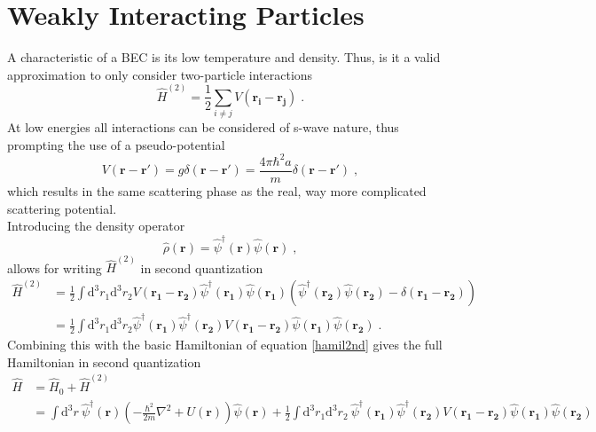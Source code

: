 \section{Weakly Interacting Particles}
A characteristic of a BEC is its low temperature and density. Thus, is it a valid approximation to only consider two-particle interactions
\begin{equation}
	\hat{H}^{(2)} = \frac{1}{2} \sum_{i \neq j} V(\boldsymbol{r_i} - \boldsymbol{r_j}) \; .
\end{equation}
At low energies all interactions can be considered of s-wave nature, thus prompting the use of a pseudo-potential
\begin{equation}
	V(\boldsymbol{r} - \boldsymbol{r'}) = g \delta(\boldsymbol{r} - \boldsymbol{r'}) = \frac{4 \pi \hbar^2 a}{m} \delta(\boldsymbol{r} - \boldsymbol{r'}) \; ,
\end{equation}
which results in the same scattering phase as the real, way more complicated scattering potential.\\
Introducing the density operator
\begin{equation}
	\hat{\rho}(\boldsymbol{r}) = \hat{\psi}^{\dag}(\boldsymbol{r}) \hat{\psi}(\boldsymbol{r}) \; ,
\end{equation}
allows for writing $\hat{H}^{(2)}$ in second quantization
\begin{align}
	\hat{H}^{(2)} &= \frac{1}{2} \int \mathrm{d^3}r_1 \mathrm{d^3}r_2 V(\boldsymbol{r_1} - \boldsymbol{r_2}) \hat{\psi}^{\dag}(\boldsymbol{r_1}) \hat{\psi}(\boldsymbol{r_1}) \left( \hat{\psi}^{\dag}(\boldsymbol{r_2}) \hat{\psi}(\boldsymbol{r_2}) - \delta(\boldsymbol{r_1} - \boldsymbol{r_2}) \right) \\
	&= \frac{1}{2} \int \mathrm{d^3}r_1 \mathrm{d^3}r_2  \hat{\psi}^{\dag}(\boldsymbol{r_1}) \hat{\psi}^{\dag}(\boldsymbol{r_2}) V(\boldsymbol{r_1} - \boldsymbol{r_2}) \hat{\psi}(\boldsymbol{r_1}) \hat{\psi}(\boldsymbol{r_2}) \; .
\end{align}
Combining this with the basic Hamiltonian of equation \ref{hamil2nd} gives the full Hamiltonian in second quantization
\begin{align}
	\hat{H} &= \hat{H}_0 + \hat{H}^{(2)} \\
	& = \int \mathrm{d^3}r \ \hat{\psi}^{\dag}(\boldsymbol{r}) \left( - \frac{\hbar^2}{2 m} \nabla^2 + U(\boldsymbol{r})\right) \hat{\psi}(\boldsymbol{r}) + \frac{1}{2} \int \mathrm{d^3}r_1 \mathrm{d^3}r_2  \ \hat{\psi}^{\dag}(\boldsymbol{r_1}) \hat{\psi}^{\dag}(\boldsymbol{r_2}) V(\boldsymbol{r_1} - \boldsymbol{r_2}) \hat{\psi}(\boldsymbol{r_1}) \hat{\psi}(\boldsymbol{r_2})
	\label{hamilint}
\end{align}

